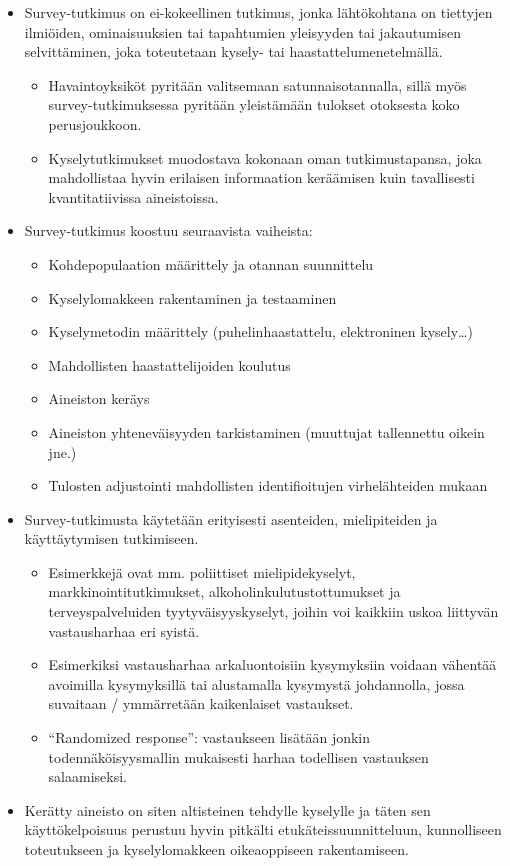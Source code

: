 \documentclass[
]{book}
\providecommand{\tightlist}{%
  \setlength{\itemsep}{0pt}\setlength{\parskip}{0pt}}
\begin{document}
\begin{itemize}
\tightlist
\item
  Survey-tutkimus on ei-kokeellinen tutkimus, jonka lähtökohtana on tiettyjen ilmiöiden, ominaisuuksien tai tapahtumien yleisyyden tai jakautumisen selvittäminen, joka toteutetaan kysely- tai haastattelumenetelmällä.

  \begin{itemize}
  \tightlist
  \item
    Havaintoyksiköt pyritään valitsemaan satunnaisotannalla, sillä myös survey-tutkimuksessa pyritään yleistämään tulokset otoksesta koko perusjoukkoon.
  \item
    Kyselytutkimukset muodostava kokonaan oman tutkimustapansa, joka mahdollistaa hyvin erilaisen informaation keräämisen kuin tavallisesti kvantitatiivissa aineistoissa.
  \end{itemize}
\item
  Survey-tutkimus koostuu seuraavista vaiheista:

  \begin{itemize}
  \tightlist
  \item
    Kohdepopulaation määrittely ja otannan suunnittelu
  \item
    Kyselylomakkeen rakentaminen ja testaaminen
  \item
    Kyselymetodin määrittely (puhelinhaastattelu, elektroninen kysely\ldots)
  \item
    Mahdollisten haastattelijoiden koulutus
  \item
    Aineiston keräys
  \item
    Aineiston yhteneväisyyden tarkistaminen (muuttujat tallennettu oikein jne.)
  \item
    Tulosten adjustointi mahdollisten identifioitujen virhelähteiden mukaan
  \end{itemize}
\item
  Survey-tutkimusta käytetään erityisesti asenteiden, mielipiteiden ja käyttäytymisen tutkimiseen.

  \begin{itemize}
  \tightlist
  \item
    Esimerkkejä ovat mm. poliittiset mielipidekyselyt, markkinointitutkimukset, alkoholinkulutustottumukset ja terveyspalveluiden tyytyväisyyskyselyt, joihin voi kaikkiin uskoa liittyvän vastausharhaa eri syistä.
  \item
    Esimerkiksi vastausharhaa arkaluontoisiin kysymyksiin voidaan vähentää avoimilla kysymyksillä tai alustamalla kysymystä johdannolla, jossa suvaitaan / ymmärretään kaikenlaiset vastaukset.
  \item
    ``Randomized response'': vastaukseen lisätään jonkin todennäköisyysmallin mukaisesti harhaa todellisen vastauksen salaamiseksi.
  \end{itemize}
\item
  Kerätty aineisto on siten altisteinen tehdylle kyselylle ja täten sen käyttökelpoisuus perustuu hyvin pitkälti etukäteissuunnitteluun, kunnolliseen toteutukseen ja kyselylomakkeen oikeaoppiseen rakentamiseen.


\end{itemize}
\end{document}
